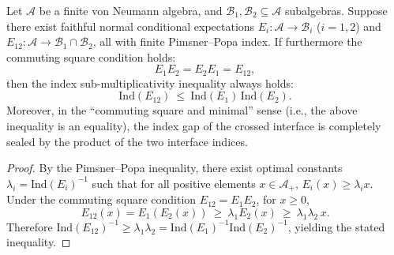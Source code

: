 \begin{proposition}\label{prop:op-algebra-index-submultiplicativity-commuting-square}
Let \(\mathcal{A}\) be a finite von Neumann algebra, and \(\mathcal{B}_1,\mathcal{B}_2\subseteq\mathcal{A}\) subalgebras.
Suppose there exist faithful normal conditional expectations
\(
E_i:\mathcal{A}\to\mathcal{B}_i
\)
(\(i=1,2\)) and
\(
E_{12}:\mathcal{A}\to\mathcal{B}_1\cap\mathcal{B}_2
\),
all with finite Pimsner--Popa index.
If furthermore the commuting square condition holds:
\[
\boxed{\;E_1E_2=E_2E_1=E_{12},\;}
\]
then the index sub-multiplicativity inequality always holds:
\[
\boxed{\;\mathrm{Ind}(E_{12})\ \le\ \mathrm{Ind}(E_1)\,\mathrm{Ind}(E_2).\;}
\]
Moreover, in the ``commuting square and minimal'' sense (i.e., the above inequality is an equality), the index gap of the crossed interface is completely sealed by the product of the two interface indices.
\end{proposition}
\begin{proof}
By the Pimsner--Popa inequality, there exist optimal constants \(\lambda_i=\mathrm{Ind}(E_i)^{-1}\) such that for all positive elements \(x\in\mathcal{A}_+\), \(E_i(x)\ge \lambda_i x\).
Under the commuting square condition \(E_{12}=E_1E_2\), for \(x\ge 0\),
\[
E_{12}(x)=E_1(E_2(x))\ \ge\ \lambda_1E_2(x)\ \ge\ \lambda_1\lambda_2\,x.
\]
Therefore \(\mathrm{Ind}(E_{12})^{-1}\ge \lambda_1\lambda_2=\mathrm{Ind}(E_1)^{-1}\mathrm{Ind}(E_2)^{-1}\), yielding the stated inequality. \qedhere
\end{proof}

